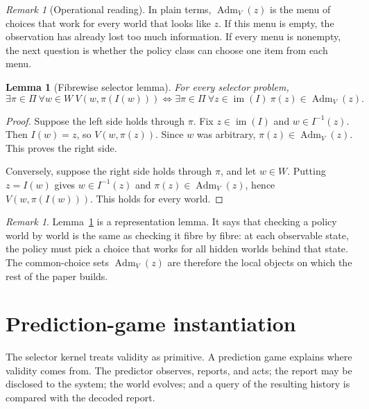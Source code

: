 \documentclass[11pt]{article}
\theoremstyle{plain}
\newtheorem{lemma}[theorem]{Lemma}
\theoremstyle{definition}
\theoremstyle{remark}
\newtheorem{remark}[theorem]{Remark}
\newcommand{\im}{\operatorname{im}}
\newcommand{\Adm}{\operatorname{Adm}}
\begin{document}
\begin{remark}[Operational reading]
In plain terms, $\Adm_V(z)$ is the menu of choices that work for every world
that looks like $z$. If this menu is empty, the observation has already lost too
much information. If every menu is nonempty, the next question is whether the
policy class can choose one item from each menu.
\end{remark}

\begin{lemma}[Fibrewise selector lemma]\label{lem:selector}
For every selector problem,
\[
\exists\pi\in\Pi\ \forall w\in W\ V(w,\pi(I(w)))
\iff
\exists\pi\in\Pi\ \forall z\in\im(I)\ \pi(z)\in\Adm_V(z).
\]
\end{lemma}

\begin{proof}
Suppose the left side holds through $\pi$. Fix $z\in\im(I)$ and
$w\in I^{-1}(z)$. Then $I(w)=z$, so $V(w,\pi(z))$. Since $w$ was arbitrary,
$\pi(z)\in\Adm_V(z)$. This proves the right side.

Conversely, suppose the right side holds through $\pi$, and let $w\in W$.
Putting $z=I(w)$ gives $w\in I^{-1}(z)$ and
$\pi(z)\in\Adm_V(z)$, hence $V(w,\pi(I(w)))$. This holds for every world.
\end{proof}

\begin{remark}
Lemma~\ref{lem:selector} is a representation lemma. It says that checking a
policy world by world is the same as checking it fibre by fibre: at each
observable state, the policy must pick a choice that works for all hidden worlds
behind that state. The common-choice sets $\Adm_V(z)$ are therefore the local
objects on which the rest of the paper builds.
\end{remark}

\section{Prediction-game instantiation}\label{sec:games}

The selector kernel treats validity as primitive. A prediction game explains
where validity comes from. The predictor observes, reports, and acts; the report
may be disclosed to the system; the world evolves; and a query of the resulting
history is compared with the decoded report.
\end{document}
